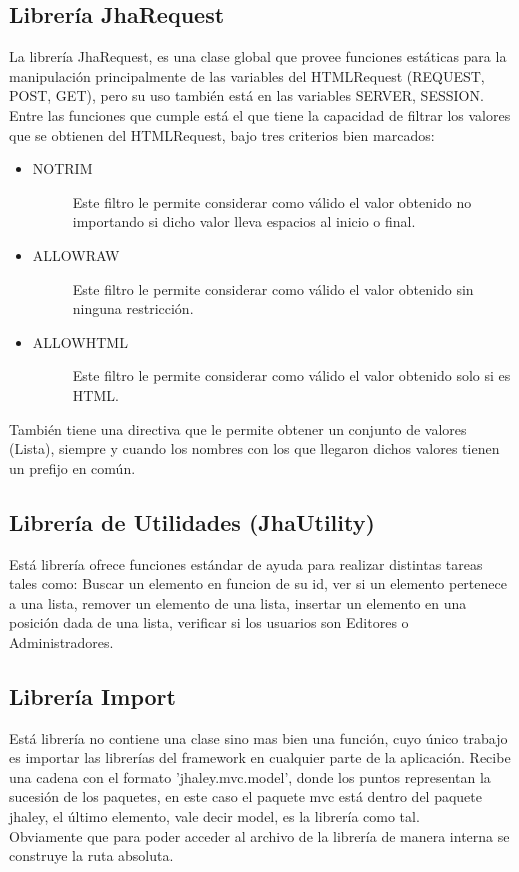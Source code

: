 \subsection{Librer\'ia JhaRequest}
La librer\'ia JhaRequest, es una clase global que provee funciones est\'aticas para la manipulaci\'on principalmente de las variables del HTMLRequest (REQUEST, POST, GET), pero su uso tambi\'en est\'a en las variables SERVER, SESSION.\\
Entre las funciones que cumple est\'a el que tiene la capacidad de filtrar los valores que se obtienen del HTMLRequest, bajo tres criterios bien marcados:
\begin{itemize}
\item \begin{description}
	\item[NOTRIM] Este filtro le permite considerar como v\'alido el valor obtenido no importando si dicho valor lleva espacios al inicio o final.
	\end{description}
\item \begin{description}
	\item[ALLOWRAW] Este filtro le permite considerar como v\'alido el valor obtenido sin ninguna restricci\'on.
	\end{description}
\item \begin{description}
	\item[ALLOWHTML] Este filtro le permite considerar como v\'alido el valor obtenido solo si es HTML.
	\end{description}
\end{itemize}
Tambi\'en tiene una directiva que le permite obtener un conjunto de valores (Lista), siempre y cuando los nombres con los que llegaron dichos valores tienen un prefijo en com\'un.

\subsection{Librer\'ia de Utilidades (JhaUtility)}
Est\'a librer\'ia ofrece funciones est\'andar de ayuda para realizar distintas tareas tales como: Buscar un elemento en funcion de su id, ver si un elemento pertenece a una lista, remover un elemento de una lista, insertar un elemento en una posici\'on dada de una lista, verificar si los usuarios son Editores o Administradores.

\subsection{Librer\'ia Import}
Est\'a librer\'ia no contiene una clase sino mas bien una funci\'on, cuyo \'unico trabajo es importar las librer\'ias del framework en cualquier parte de la aplicaci\'on. Recibe una cadena con el formato \textsf{'jhaley.mvc.model'}, donde los puntos representan la sucesi\'on de los paquetes, en este caso el paquete \textsf{mvc} est\'a dentro del paquete \textsf{jhaley}, el \'ultimo elemento, vale decir \textsf{model}, es la librer\'ia como tal.\\
Obviamente que para poder acceder al archivo de la librer\'ia de manera interna se construye la ruta absoluta.

